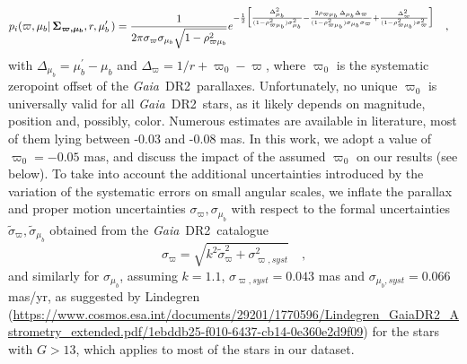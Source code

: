 \documentclass{nature}
\newcommand{\gdrtwo}{\textit{Gaia}~DR2}
\begin{document}
\begin{methods}
\begin{equation}
\begin{split}
\label{mubplxcorr_2dgauss}
        p_i(\varpi, \mu_{b}  |\, \boldsymbol{   \Sigma_{\varpi,\mu_b}},  r, \mu^\prime_{b} \,)        & = \frac{1}{2 \pi \sigma_{\varpi} \sigma_{\mu_b} \sqrt{1 - \rho^2_{\varpi \mu_{b}}}} e^{-\frac{1}{2} 
          \Bigl[ 
            \frac{   \Delta_{\mu_b} ^2}{ (1-\rho^2_{\varpi \mu_{b}})  \sigma^2_{\mu_b}}  
           - \frac{ 2 \rho_{\varpi \mu_{b}}\, \Delta_{\mu_b} \Delta_{\varpi}   }{ (1-\rho^2_{\varpi \mu_{b}}) \sigma_{\mu_b} \sigma_{\varpi}  }  
           +  \frac{ \Delta_{\varpi} ^2 }{  (1-\rho^2_{\varpi \mu_{b}})  \sigma^2_{\varpi}} 
            \Bigr]
          } 
          \quad ,
\end{split}          
\end{equation}
with $\Delta_{\mu_b} = \mu^\prime_b - \mu_{b}$ and $\Delta_{\varpi} = 1/r + \varpi_{0} - \varpi $, where $\varpi_{0}$ is the systematic zeropoint offset of the \gdrtwo\, parallaxes. Unfortunately, no unique $\varpi_{0}$ is universally valid for all \gdrtwo\, stars, as it likely depends on magnitude, position and, possibly, color. Numerous estimates are available in literature\cite{Lindegren:2018,Arenou:2018,Riess:2018,Zinn:2019,Schoenrich:2019}, most of them lying between -0.03 and -0.08 mas. In this work, we adopt a value of $\varpi_{0}=-0.05$ mas, and discuss the impact of the assumed $\varpi_{0}$ on our results (see below). To take into account the additional uncertainties introduced by the variation of the systematic errors on small angular scales, we inflate the parallax and proper motion uncertainties $\sigma_{\varpi},\sigma_{\mu_{b}}$ with respect to the formal uncertainties $\tilde{\sigma}_{\varpi},\tilde{\sigma}_{\mu_{b}}$ obtained from the \gdrtwo\, catalogue 
\begin{equation}
\label{syst}
\sigma_{\varpi} =\sqrt{ k^2 \tilde{\sigma}^2_{\varpi} + \sigma^2_{\varpi,syst}} \quad,
\end{equation}
and similarly for $\sigma_{\mu_b}$, assuming $k=1.1$, $\sigma_{\varpi,syst}=0.043$ mas and $\sigma_{\mu_b,syst}=0.066$ mas/yr, as suggested by Lindegren ({\small \url{https://www.cosmos.esa.int/documents/29201/1770596/Lindegren_GaiaDR2_Astrometry_extended.pdf/1ebddb25-f010-6437-cb14-0e360e2d9f09})} for the stars with $G>13$, which applies to most of the stars in our dataset. 


\end{methods}
\end{document}
